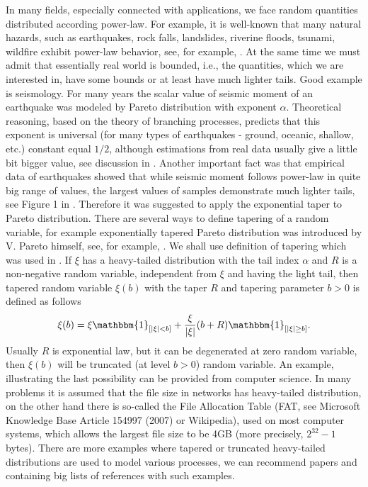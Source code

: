 \documentclass[12pt]{article}
\def\a{\alpha}
\newcommand{\ind}[1]{\mathbbm{1}_{#1}}
\theoremstyle{plain}
\theoremstyle{definition}
\begin{document}
In many fields, especially connected with applications, we face random quantities distributed according power-law. For example, it is well-known that many  natural hazards,  such as earthquakes, rock falls, landslides, riverine floods, tsunami, wildfire exhibit power-law behavior, see, for example, \cite{Geist}. At the same time we must admit that essentially real world is bounded, i.e., the quantities, which we are interested in, have some bounds or at least have much lighter tails. Good example is seismology. For many years the scalar value of seismic moment of an earthquake was modeled by Pareto distribution with exponent $\a$. Theoretical reasoning, based on the theory of branching processes, predicts that this exponent is universal (for many types of earthquakes - ground, oceanic, shallow, etc.) constant equal $1/2$, although estimations from real data usually give a little bit bigger value, see discussion in \cite{Kagan}. Another important fact was that empirical data of earthquakes showed that while seismic moment follows power-law in quite big range of values, the largest values of samples demonstrate much lighter tails, see Figure 1 in \cite{Kagan}. Therefore it was suggested to apply the exponential taper to Pareto distribution. There are  several ways to define tapering of a random variable, for example exponentially tapered Pareto distribution was introduced by V. Pareto himself, see, for example, \cite{Vaiciulis}. We shall use definition of tapering which was used in \cite{Chakrabarty}.  If $\xi$ has a heavy-tailed distribution with the tail index $\a$ and $R$ is a non-negative random variable, independent from $\xi$ and having the light tail, then tapered random variable $\xi(b)$ with the taper $R$ and tapering parameter $b>0$ is defined as follows
$$
\xi(b)=\xi \ind{[|\xi|<b]}+\frac{\xi}{|\xi|}(b+R)\ind{[|\xi|\ge b]}.
$$
Usually $R$ is exponential law, but it can be degenerated at zero random variable, then $\xi (b)$ will be truncated (at level $b>0$) random variable. An example, illustrating the last possibility can  be provided from computer science. In many problems it is assumed that the file size in networks has heavy-tailed distribution, on the other hand there is so-called the File Allocation Table (FAT, see Microsoft Knowledge Base Article 154997 (2007) or Wikipedia), used on most computer systems, which allows the
largest file size to be 4GB (more precisely, $2^{32}-1$ bytes). There are more examples where tapered or truncated  heavy-tailed distributions are used to model various processes, we can recommend papers \cite{Aban} and \cite{Meerschaert} containing big lists of references with such examples.
\end{document}
